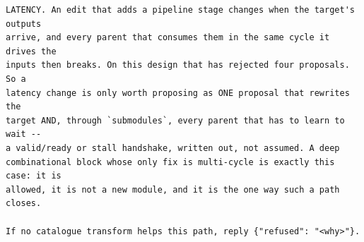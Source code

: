 \begin{lstlisting}[style=plain]
LATENCY. An edit that adds a pipeline stage changes when the target's outputs
arrive, and every parent that consumes them in the same cycle it drives the
inputs then breaks. On this design that has rejected four proposals. So a
latency change is only worth proposing as ONE proposal that rewrites the
target AND, through `submodules`, every parent that has to learn to wait --
a valid/ready or stall handshake, written out, not assumed. A deep
combinational block whose only fix is multi-cycle is exactly this case: it is
allowed, it is not a new module, and it is the one way such a path closes.

If no catalogue transform helps this path, reply {"refused": "<why>"}.
\end{lstlisting}
